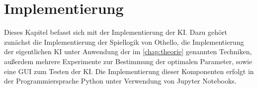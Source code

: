 
\chapter{Implementierung}
\label{chap:implementation}

Dieses Kapitel befasst sich mit der Implementierung der \ac{KI}. Dazu gehört zunächst die Implementierung
der Spiellogik von Othello, die Implementierung der eigentlichen \ac{KI} unter Anwendung der im
\autoref{chap:theorie} genannten Techniken, außerdem mehrere Experimente zur Bestimmung der optimalen Parameter, sowie eine \ac{GUI}
zum Testen der \ac{KI}. Die Implementierung dieser Komponenten erfolgt in der
Programmiersprache Python unter Verwendung von Jupyter Notebooks. 






